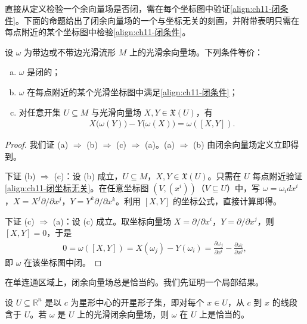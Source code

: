 \documentclass[../../main.tex]{subfiles}
\begin{document}
直接从定义检验一个余向量场是否闭，需在每个坐标图中验证\eqref{align:ch11-闭条件}。下面的命题给出了闭余向量场的一个与坐标无关的刻画，并附带表明只需在每点附近的某个坐标图中检验\eqref{align:ch11-闭条件}。

\begin{proposition}\label{proposition:ch11-闭的等价刻画}
设 $\omega$ 为带边或不带边光滑流形 $M$ 上的光滑余向量场。下列条件等价：
\begin{enumerate}[(a)]
\item $\omega$ 是闭的；
\item $\omega$ 在每点附近的某个光滑坐标图中满足\eqref{align:ch11-闭条件}；
\item 对任意开集 $U\subseteq M$ 与光滑向量场 $X,Y\in\mathfrak X(U)$，有
\begin{align}
X\big(\omega(Y)\big)-Y\big(\omega(X)\big)=\omega([X,Y]).\label{align:ch11-闭坐标无关}
\end{align}
\end{enumerate}
\end{proposition}

\begin{proof}
我们证 (a) $\Rightarrow$ (b) $\Rightarrow$ (c) $\Rightarrow$ (a)。(a) $\Rightarrow$ (b) 由闭余向量场定义立即得到。

下证 (b) $\Rightarrow$ (c)：设 (b) 成立，$U\subseteq M$，$X,Y\in\mathfrak X(U)$。只需在 $U$ 每点附近验证\eqref{align:ch11-闭坐标无关}。在任意坐标图 $(V,(x^i))$（$V\subseteq U$）中，写 $\omega=\omega_i dx^i$，$X=X^j\partial/\partial x^j$，$Y=Y^k\partial/\partial x^k$。利用 $[X,Y]$ 的坐标公式，直接计算即得。

下证 (c) $\Rightarrow$ (a)：设 (c) 成立。取坐标向量场 $X=\partial/\partial x^i$，$Y=\partial/\partial x^j$，则 $[X,Y]=0$，于是
\begin{align*}
0=\omega([X,Y])=X(\omega_j)-Y(\omega_i)=\frac{\partial\omega_j}{\partial x^i}-\frac{\partial\omega_i}{\partial x^j},
\end{align*}
即 $\omega$ 在该坐标图中闭。
\end{proof}
在单连通区域上，闭余向量场总是恰当的。我们先证明一个局部结果。

\begin{theorem}\label{theorem:ch11-星形区域闭即恰当}
设 $U\subseteq\mathbb{R}^n$ 是以 $c$ 为星形中心的开星形子集，即对每个 $x\in U$，从 $c$ 到 $x$ 的线段含于 $U$。若 $\omega$ 是 $U$ 上的光滑闭余向量场，则 $\omega$ 在 $U$ 上是恰当的。
\end{theorem}
\end{document}
